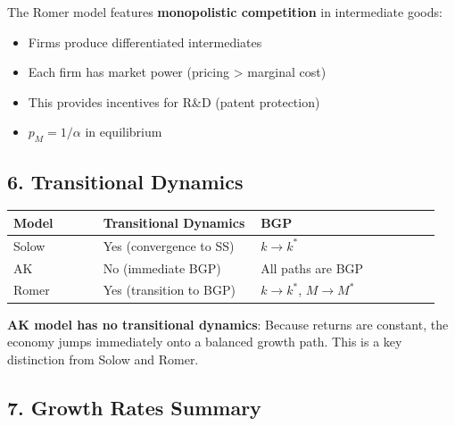 \bigskip
\begin{tcolorbox}[colback=green!5,colframe=green3,title=Romer Key Feature]
The Romer model features \textbf{monopolistic competition} in intermediate goods:
\begin{itemize}
    \item Firms produce differentiated intermediates
    \item Each firm has market power (pricing > marginal cost)
    \item This provides incentives for R\&D (patent protection)
    \item $p_M = 1/\alpha$ in equilibrium
\end{itemize}
\end{tcolorbox}

\subsection*{6. Transitional Dynamics}

\begin{tabular}{p{0.2\linewidth}p{0.35\linewidth}p{0.4\linewidth}}
\toprule
\textbf{Model} & \textbf{Transitional Dynamics} & \textbf{BGP} \\
\midrule
Solow & Yes (convergence to SS) & $k \to k^*$ \\
AK & No (immediate BGP) & All paths are BGP \\
Romer & Yes (transition to BGP) & $k \to k^*$, $M \to M^*$ \\
\bottomrule
\end{tabular}

\bigskip
\begin{tcolorbox}[colback=orange!10,colframe=orange3,title=Key Insight]
\textbf{AK model has no transitional dynamics}: Because returns are constant, the economy jumps immediately onto a balanced growth path. This is a key distinction from Solow and Romer.
\end{tcolorbox}

\subsection*{7. Growth Rates Summary}

